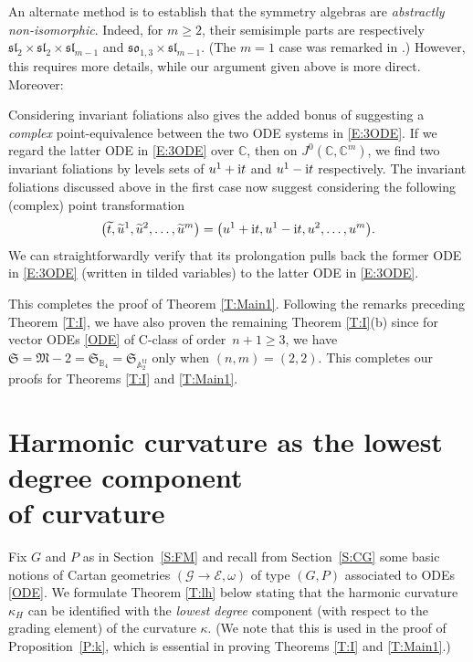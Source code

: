 \documentclass[10pt,a4paper]{amsart}
\DeclareMathOperator{\tf}{tf}
\newcommand\cG{\mathcal{G}}
\newcommand\fM{\mathfrak{M}}
\newcommand\fS{\mathfrak{S}}
\newcommand\fsl{\mathfrak{sl}}
\newcommand{\C}{\mathbb{C}}
\newcommand\bbA{\mathbb{A}}
\newcommand\bbB{\mathbb{B}}
\newcommand\cE{\mathcal{E}}
\numberwithin{equation}{section}
\begin{document}
 An alternate method is to establish that the symmetry algebras are {\em abstractly non-isomorphic}. Indeed, for $m \geq 2$, their semisimple parts are respectively $\fsl_2 \times \fsl_2 \times \fsl_{m-1}$ and $\mathfrak{so}_{1,3} \times \fsl_{m-1}$. (The $m=1$ case was remarked in \cite[p.~18]{AMS2021}.) However, this requires more details, while our argument given above is more direct. Moreover:

 \begin{Remark} Considering invariant foliations also gives the added bonus of suggesting a {\em complex} point-equivalence between the two ODE systems in \eqref{E:3ODE}. If we regard the latter ODE in \eqref{E:3ODE} over $\C$, then on $J^0(\C,\C^m)$, we find two invariant foliations by levels sets of $u^1 + {\rm i} t$ and $u^1 - {\rm i} t$ respectively. The invariant foliations discussed above in the first case now suggest considering the following (complex) point transformation
 \begin{align*}
 \bigl(\widetilde{t}, \widetilde{u}^1, \widetilde{u}^2,\dots , \widetilde{u}^m\bigr) = \bigl(u^1 + {\rm i} t, u^1 - {\rm i} t, u^2,\dots , u^m\bigr).
 \end{align*}
 We can straightforwardly verify that its prolongation pulls back the former ODE in \eqref{E:3ODE} (written in tilded variables) to the latter ODE in \eqref{E:3ODE}.
\end{Remark}

This completes the proof of Theorem \ref{T:Main1}. Following the remarks preceding Theorem \ref{T:I}, we have also proven the remaining Theorem \ref{T:I}(b) since for vector ODEs \eqref{ODE} of C-class of order~$n+1 \ge 3$, we have $\fS = \fM-2 = \fS_{\bbB_4} = \fS_{\bbA_2^{\tf}}$ only when $(n,m)= (2,2)$. This completes our proofs for Theorems \ref{T:I} and \ref{T:Main1}.


\appendix

\section[Harmonic curvature as the lowest degree component of curvature]{Harmonic curvature as the lowest degree component\\ of curvature} \label{S:kappa}

Fix $G$ and $P$ as in Section~\ref{S:FM} and recall from Section~\ref{S:CG} some basic notions of Cartan geometries $(\cG \to \cE, \omega)$ of type $(G, P)$ associated to ODEs \eqref{ODE}. We formulate Theorem \ref{T:lh} below stating that the harmonic curvature $\kappa_H$ can be identified with the {\em lowest degree} component (with respect to the grading element) of the curvature $\kappa$. (We note that this is used in the proof of Proposition~\ref{P:k}, which is essential in proving Theorems \ref{T:I} and \ref{T:Main1}.)
\end{document}
